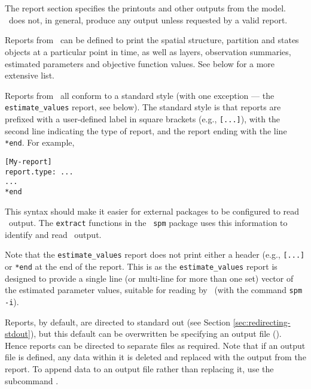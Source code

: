 \section{\label{sec:report-section}}

The report section specifies the printouts and other outputs from the model. \SPM\ does not, in general, produce any output unless requested by a valid report. 

Reports from \SPM\ can be defined to print the spatial structure, partition and states objects at a particular point in time, as well as layers, observation summaries, estimated parameters and objective function values. See below for a more extensive list.

Reports from \SPM\ all conform to a standard style (with one exception --- the \texttt{estimate\_values} report, see below). The standard style is that reports are prefixed with a user-defined label in square brackets (e.g., \texttt{[...]}), with the second line indicating the type of report, and the report ending with the line \texttt{*end}. For example,

\begin{verbatim} 
[My-report]
report.type: ...
...
*end
\end{verbatim}

This syntax should make it easier for external packages to be configured to read \SPM\ output. The \texttt{extract} functions in the \R\ \texttt{spm} package uses this information to identify and read \SPM\ output.

Note that the \texttt{estimate\_values} report does not print either a header (e.g., \texttt{[...]} or \texttt{*end} at the end of the report. This is as the \texttt{estimate\_values} report is designed to provide a single line (or multi-line for more than one set) vector of the estimated parameter values, suitable for reading by \SPM\ (with the command \texttt{spm -i}). 

Reports, by default, are directed to standard out (see Section \ref{sec:redirecting-stdout}), but this default can be overwritten be specifying an output file (). Hence reports can be directed to separate files as required. Note that if an output file is defined, any data within it is deleted and replaced with the output from the report. To append data to an output file rather than replacing it, use the subcommand .

